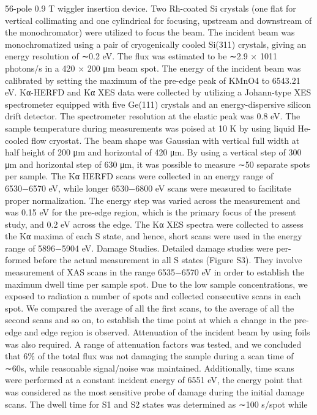 \documentclass{article}
\begin{document}
56-pole 0.9 T wiggler insertion device. Two Rh-coated Si
crystals (one flat for vertical collimating and one cylindrical for
focusing, upstream and downstream of the monochromator)
were utilized to focus the beam. The incident beam was
monochromatized using a pair of cryogenically cooled Si(311)
crystals, giving an energy resolution of ∼0.2 eV. The flux was
estimated to be ∼2.9 × 1011 photons/s in a 420 × 200 μm
beam spot. The energy of the incident beam was calibrated by
setting the maximum of the pre-edge peak of KMnO4 to
6543.21 eV. Kα-HERFD and Kα XES data were collected by
utilizing a Johann-type XES spectrometer equipped with five
Ge(111) crystals and an energy-dispersive silicon drift
detector. The spectrometer resolution at the elastic peak was
0.8 eV. The sample temperature during measurements was
poised at 10 K by using liquid He-cooled flow cryostat. The
beam shape was Gaussian with vertical full width at half height
of 200 μm and horizontal of 420 μm. By using a vertical step of
300 μm and horizontal step of 630 μm, it was possible to
measure ∼50 separate spots per sample. The Kα HERFD scans
were collected in an energy range of 6530−6570 eV, while
longer 6530−6800 eV scans were measured to facilitate proper
normalization. The energy step was varied across the
measurement and was 0.15 eV for the pre-edge region,
which is the primary focus of the present study, and 0.2 eV
across the edge. The Kα XES spectra were collected to assess
the Kα maxima of each S state, and hence, short scans were
used in the energy range of 5896−5904 eV.
Damage Studies. Detailed damage studies were per-
formed before the actual measurement in all S states (Figure
S3). They involve measurement of XAS scans in the range
6535−6570 eV in order to establish the maximum dwell time
per sample spot. Due to the low sample concentrations, we
exposed to radiation a number of spots and collected
consecutive scans in each spot. We compared the average of
all the first scans, to the average of all the second scans and so
on, to establish the time point at which a change in the pre-
edge and edge region is observed. Attenuation of the incident
beam by using foils was also required. A range of attenuation
factors was tested, and we concluded that 6\% of the total flux
was not damaging the sample during a scan time of ∼60s, while
reasonable signal/noise was maintained. Additionally, time
scans were performed at a constant incident energy of 6551 eV,
the energy point that was considered as the most sensitive
probe of damage during the initial damage scans. The dwell
time for S1 and S2 states was determined as ∼100 s/spot while
\end{document}
